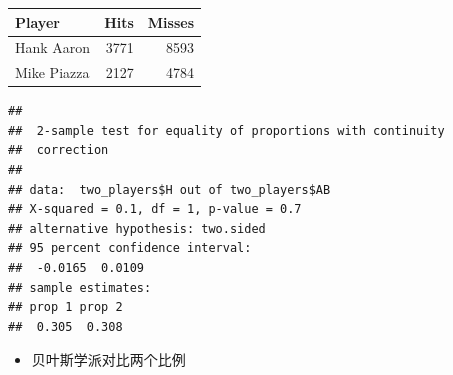\documentclass[]{book}
\newenvironment{Shaded}{\begin{snugshade}}{\end{snugshade}}
\newcommand{\DataTypeTok}[1]{\textcolor[rgb]{0.13,0.29,0.53}{#1}}
\newcommand{\KeywordTok}[1]{\textcolor[rgb]{0.13,0.29,0.53}{\textbf{#1}}}
\newcommand{\NormalTok}[1]{#1}
\newcommand{\OperatorTok}[1]{\textcolor[rgb]{0.81,0.36,0.00}{\textbf{#1}}}
\newcommand{\StringTok}[1]{\textcolor[rgb]{0.31,0.60,0.02}{#1}}
\providecommand{\tightlist}{%
  \setlength{\itemsep}{0pt}\setlength{\parskip}{0pt}}
\begin{document}
\begin{Shaded}
\end{Shaded}

\begin{tabular}{l|r|r}
\hline
Player & Hits & Misses\\
\hline
Hank Aaron & 3771 & 8593\\
\hline
Mike Piazza & 2127 & 4784\\
\hline
\end{tabular}

\begin{Shaded}
\end{Shaded}

\begin{verbatim}
## 
##  2-sample test for equality of proportions with continuity
##  correction
## 
## data:  two_players$H out of two_players$AB
## X-squared = 0.1, df = 1, p-value = 0.7
## alternative hypothesis: two.sided
## 95 percent confidence interval:
##  -0.0165  0.0109
## sample estimates:
## prop 1 prop 2 
##  0.305  0.308
\end{verbatim}

\begin{itemize}
\tightlist
\item
  贝叶斯学派对比两个比例
\end{itemize}
\end{document}

